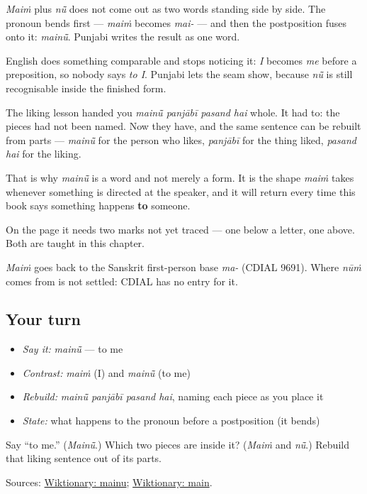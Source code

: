 \begin{cousinweb}
\emph{Maiṁ} plus \emph{nū̃} does not come out as two words standing side by side. The pronoun bends first — \emph{maiṁ} becomes \emph{mai-} — and then the postposition fuses onto it: \emph{mainū̃}. Punjabi writes the result as one word.

English does something comparable and stops noticing it: \emph{I} becomes \emph{me} before a preposition, so nobody says \emph{to I}. Punjabi lets the seam show, because \emph{nū̃} is still recognisable inside the finished form.

The liking lesson handed you \emph{mainū̃ panjābī pasand hai} whole. It had to: the pieces had not been named. Now they have, and the same sentence can be rebuilt from parts — \emph{mainū̃} for the person who likes, \emph{panjābī} for the thing liked, \emph{pasand hai} for the liking.

That is why \emph{mainū̃} is a word and not merely a form. It is the shape \emph{maiṁ} takes whenever something is directed at the speaker, and it will return every time this book says something happens \textbf{to} someone.

On the page it needs two marks not yet traced — one below a letter, one above. Both are taught in this chapter.

\emph{Maiṁ} goes back to the Sanskrit first-person base \emph{ma-} (CDIAL 9691). Where \emph{nūṁ} comes from is not settled: CDIAL has no entry for it.
\end{cousinweb}

\subsection*{Your turn}
\begin{itemize}
\raggedright
  \item \emph{Say it:} \emph{mainū̃} — to me
  \item \emph{Contrast:} \emph{maiṁ} (I) and \emph{mainū̃} (to me)
  \item \emph{Rebuild:} \emph{mainū̃ panjābī pasand hai}, naming each piece as you place it
  \item \emph{State:} what happens to the pronoun before a postposition (it bends)
\end{itemize}

\begin{tcolorbox}[breakable,colback=teal!4,colframe=teal!35!black,title={Before you move on}]
Say \textquotedblleft{}to me.\textquotedblright{} (\emph{Mainū̃}.) Which two pieces are inside it? (\emph{Maiṁ} and \emph{nū̃}.) Rebuild that liking sentence out of its parts.

Sources: \href{https://en.wiktionary.org/wiki/\%E0\%A8\%AE\%E0\%A9\%88\%E0\%A8\%A8\%E0\%A9\%82\%E0\%A9\%B0}{Wiktionary: mainu}; \href{https://en.wiktionary.org/wiki/\%E0\%A8\%AE\%E0\%A9\%88\%E0\%A9\%B0}{Wiktionary: main}.
\end{tcolorbox}
